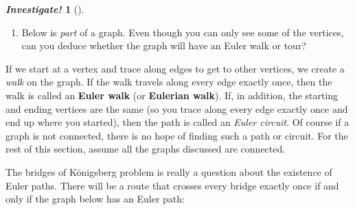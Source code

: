 \documentclass[10pt,]{book}
\newcommand{\terminology}[1]{\textbf{#1}}
\theoremstyle{plain}
\theoremstyle{definition}
\theoremstyle{definition}
\newtheorem{investigation}[project]{\emph{Investigate!}}
\theoremstyle{definition}
\numberwithin{equation}{chapter}
\newcommand{\vtx}[2]{node[fill,circle,inner sep=0pt, minimum size=4pt,label=#1:#2]{}}
\renewcommand{\v}{\vtx{above}{}}
\begin{document}
\begin{investigation}[]
\begin{enumerate}
%
\item\hypertarget{li-1218}{}
Below is \emph{part} of a graph. Even though you can only see some of the vertices, can you deduce whether the graph will have an Euler walk or tour?
%
\leavevmode%
\begin{figure}
\centering
{
}
\end{figure}
\end{enumerate}

%
\end{investigation}

If we start at a vertex and trace along edges to get to other vertices, we create a \emph{walk} on the graph. If the walk travels along every edge exactly once, then the walk is called an \terminology{Euler walk} (or \terminology{Eulerian walk}). If, in addition, the starting and ending vertices are the same (so you trace along every edge exactly once and end up where you started), then the path is called an \emph{Euler circuit}. Of course if a graph is not connected, there is no hope of finding such a path or circuit. For the rest of this section, assume all the graphs discussed are connected.
%
\par

The bridges of Königsberg problem is really a question about the existence of Euler paths. There will be a route that crosses every bridge exactly once if and only if the graph below has an Euler path:
%
\par


\leavevmode%
\begin{figure}
\centering
{
}
\end{figure}
\end{document}
